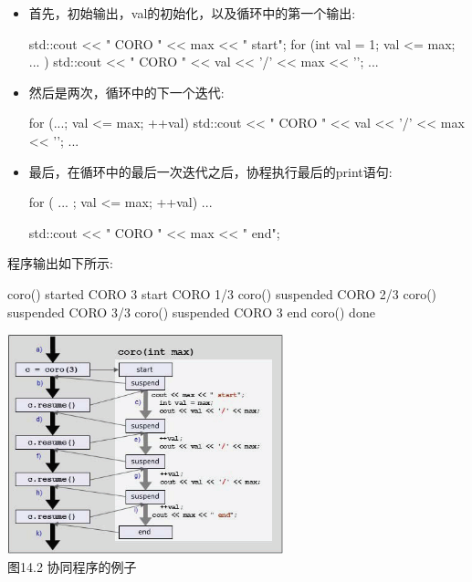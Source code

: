 \begin{itemize}
\item
首先，初始输出，val的初始化，以及循环中的第一个输出:

\begin{cpp}
std::cout << "                 CORO " << max << " start\n";
for (int val = 1; val <= max; ... ) {
	std::cout << "               CORO " << val << '/' << max << '\n';
	...
}
\end{cpp}

\item
然后是两次，循环中的下一个迭代:

\begin{cpp}
	for (...; val <= max; ++val) {
		std::cout << "               CORO " << val << '/' << max << '\n';
		...
	}
\end{cpp}

\item
最后，在循环中的最后一次迭代之后，协程执行最后的print语句:

\begin{cpp}
for ( ... ; val <= max; ++val) {
	...
}

std::cout << " CORO " << max << " end\n";
\end{cpp}
\end{itemize}

程序输出如下所示:

\begin{shell}
coro() started
         CORO 3 start
         CORO 1/3
coro() suspended
         CORO 2/3
coro() suspended
         CORO 3/3
coro() suspended
         CORO 3 end
coro() done
\end{shell}


\begin{center}
\includegraphics[width=0.6\textwidth]{content/chapter14/images/2.png}\\
图14.2 协同程序的例子
\end{center}

